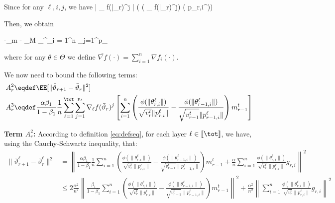 \documentclass{article}
\begin{document}
Since for any $\ell, i , j$, we have
\beq
  \EE{} \leq   \left| \nabla_{\ell} f(\bar{\vartheta}_r)^j \right| \left( \sign(  \nabla_{\ell} f(\bar{\vartheta}_r)^j) \neq  \sign( p_{r,i}^{\ell})\right) 
\eeq

Then, we obtain

\beq\label{eq:finala1}
\EE[A_1]  \leq -\alpha \phi_m     -  \alpha \phi_M \sum_{}^\tot \sum_{i = 1}^n \sum_{j=1}^{p_\ell} 
\eeq

where  for any $\theta \in \Theta$ we define $\overline{\nabla f}( \cdot) = \sum_{i=1}^n \nabla f_i(\cdot)$.

We now need to bound the following terms:
\begin{align}
& A_r^2 \eqdef \EE[  \| \bar{\vartheta}_{r+1} - \bar{\vartheta}_r \|^2]\\
& A_r^3 \eqdef  \frac{\alpha \beta_1}{1-\beta_1}  \frac{1}{n} \sum_{\ell=1}^\tot \sum_{j=1}^{p_\ell} \nabla_{\ell} f(\bar{\vartheta}_r)^j \left[   \sum_{i = 1}^n  \left( \frac{\phi(\|\theta_{r,i}^{\ell}\|)}{\sqrt{v^{t}_{r}} \|p_{r,i}^{\ell}\|} - \frac{\phi(\|\theta_{r-1,i}^{\ell}\|)}{\sqrt{v^{t}_{r-1}} \|p_{r-1,i}^{\ell}\|} \right) m^{t}_{r-1}  \right]
\end{align}

\textbf{ Term $A_r^2$:}
According to definition \eqref{eq:defseq}, for each layer $\ell \in \llbracket \tot \rrbracket$, we have, using the Cauchy-Schwartz inequality, that:
\begin{align}
  \| \bar{\vartheta}^\ell_{r+1} - \bar{\vartheta}^\ell_r \|^2 & = \left\| \frac{\alpha \beta_1}{1-\beta_1} \frac{1}{n}  \sum_{i = 1}^n  \left( \frac{\phi(\|\theta_{r,i}^{\ell}\|)}{\sqrt{v^{t}_{r}} \|p_{r,i}^{\ell}\|} - \frac{\phi(\|\theta_{r-1,i}^{\ell}\|)}{\sqrt{v^{t}_{r-1}} \|p_{r-1,i}^{\ell}\|} \right) m^{t}_{r-1} + \frac{\alpha}{n} \sum_{i = 1}^n \frac{\phi(\|\theta_{r,i}^{\ell}\|)}{\sqrt{v^{t}_{r}} \|p_{r,i}^{\ell}\|} g_{r,i}\right \|^2 \\
&  \leq 2\frac{\alpha^2}{n^2} \left\| \frac{ \beta_1}{1-\beta_1}   \sum_{i = 1}^n  \left( \frac{\phi(\|\theta_{r,i}^{\ell}\|)}{\sqrt{v^{t}_{r}} \|p_{r,i}^{\ell}\|} - \frac{\phi(\|\theta_{r-1,i}^{\ell}\|)}{\sqrt{v^{t}_{r-1}} \|p_{r-1,i}^{\ell}\|} \right) m^{t}_{r-1}\right\|^2 + \frac{\alpha^2}{n^2} \left\| \sum_{i = 1}^n \frac{\phi(\|\theta_{r,i}^{\ell}\|)}{\sqrt{v^{t}_{r}} \|p_{r,i}^{\ell}\|} g_{r,i}\right\|^2
\end{align}
\end{document}
